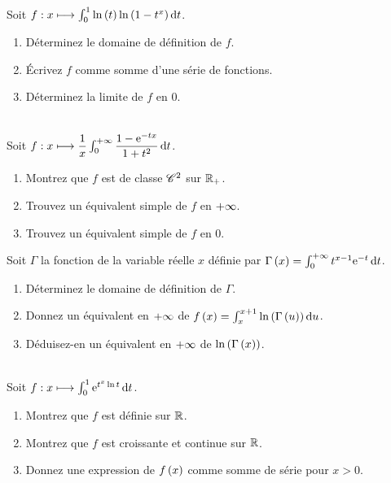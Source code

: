 \begin{exo}~\\
Soit \(f:x\mapsto\int_0^1\ln\paren{t}\ln\paren{1-t^x}\odif{t}\).

\begin{enumerate}
    \item Déterminez le domaine de définition de \(f\). \\
    \item Écrivez \(f\) comme somme d'une série de fonctions. \\
    \item Déterminez la limite de \(f\) en \(0\).
\end{enumerate}
\end{exo}

\begin{exo}~\\
Soit \(f:x\mapsto\dfrac{1}{x}\int_0^{\pinf}\dfrac{1-\e{-tx}}{1+t^2}\odif{t}\).

\begin{enumerate}
    \item Montrez que \(f\) est de classe \(\mathscr{C}^{2}\) sur \(\mathbb{R}_+\). \\
    \item Trouvez un équivalent simple de \(f\) en \(+\infty\). \\
    \item Trouvez un équivalent simple de \(f\) en \(0\).
\end{enumerate}
\end{exo}

\begin{exo}
Soit \(\Gamma\) la fonction de la variable réelle \(x\) définie par \(\Gamma\paren{x}=\int_0^{\pinf}t^{x-1}\e{-t}\odif{t}\).

\begin{enumerate}
    \item Déterminez le domaine de définition de \(\Gamma\). \\
    \item Donnez un équivalent en \(+\infty\) de \(f\paren{x}=\int_x^{x+1}\ln\paren{\Gamma\paren{u}}\odif{u}\). \\
    \item Déduisez-en un équivalent en \(+\infty\) de \(\ln\left(\Gamma\left(x\right)\right)\).
\end{enumerate}
\end{exo}

\begin{exo}~\\
Soit \(f:x\mapsto\int_0^1\e{t^x\ln t}\odif{t}\).

\begin{enumerate}
    \item Montrez que \(f\) est définie sur \(\mathbb{R}\). \\
    \item Montrez que \(f\) est croissante et continue sur \(\mathbb{R}\). \\
    \item Donnez une expression de \(f\left(x\right)\) comme somme de série pour \(x>0\).
\end{enumerate}
\end{exo}

